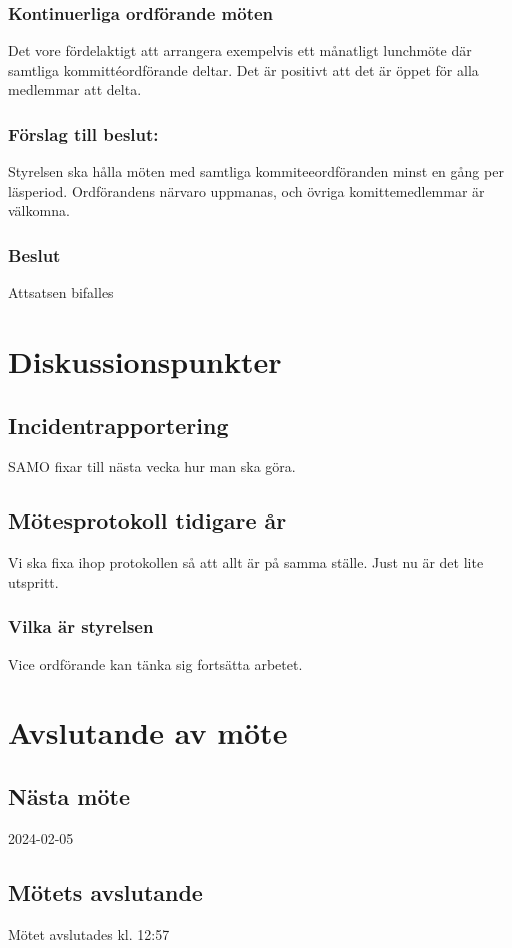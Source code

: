 \documentclass[protokoll]{dvd}
\begin{document}
\subsubsection*{Kontinuerliga ordförande möten}
Det vore fördelaktigt att arrangera exempelvis ett månatligt lunchmöte där samtliga kommittéordförande deltar. Det är positivt att det är öppet för alla medlemmar att delta.
\subsubsection*{Förslag till beslut:}
\begin{attsatser}
    \item Styrelsen ska hålla möten med samtliga kommiteeordföranden minst en gång per läsperiod. Ordförandens närvaro uppmanas, och övriga komittemedlemmar är välkomna.
\end{attsatser}

\subsubsection*{Beslut}
\begin{attsatser}
    \item Attsatsen bifalles
\end{attsatser}


\section{Diskussionspunkter}

\subsection*{Incidentrapportering}
SAMO fixar till nästa vecka hur man ska göra.

\subsection*{Mötesprotokoll tidigare år}
Vi ska fixa ihop protokollen så att allt är på samma ställe. Just nu är det lite utspritt.

\subsubsection*{Vilka är styrelsen}
Vice ordförande kan tänka sig fortsätta arbetet.


\newpage
\section{Avslutande av möte}

\subsection{Nästa möte}
2024-02-05

\subsection{Mötets avslutande}
Mötet avslutades kl. 12:57

\styrelsesignaturer
\end{document}
